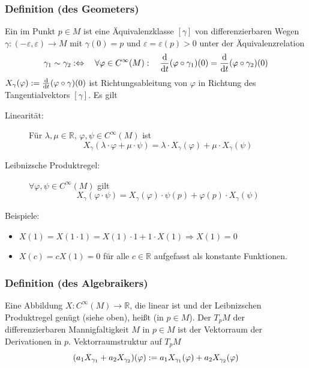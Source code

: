 \subsubsection[Definition: Tangentialraum (geometrisch)]{Definition (des Geometers)} %
\label{ssub:151}
Ein  im Punkt $p \in M$ ist eine Äquivalenzklasse $[\gamma]$ von differenzierbaren Wegen $\gamma : (-\varepsilon, \varepsilon) \to M$ mit 
$\gamma(0)=p$ und $\varepsilon = \varepsilon(p)>0$ unter der Äquivalenzrelation
\[
	\gamma_1 \sim \gamma_2 :\Leftrightarrow \quad \forall \varphi \in C^\infty(M) :\quad  \frac{\mathrm{d} }{\mathrm{d} t} ( \varphi \circ \gamma_1)(0) = \frac{\mathrm{d} }{\mathrm{d} t}  (\varphi \circ \gamma_2) (0)   
\]
$X_\gamma(\varphi) := \frac{\mathrm{d} }{\mathrm{d} t}  (\varphi \circ \gamma)(0)$ ist  Richtungsableitung von $\varphi$ in Richtung des Tangentialvektors $[\gamma]$. Es gilt
\begin{description}
	\item[Linearität:] Für $\lambda , \mu \in \mathds{R}$, $\varphi, \psi \in C^\infty(M) $ ist
	\[
		X_\gamma(\lambda  \cdot \varphi + \mu \cdot \psi) = \lambda \cdot X_\gamma(\varphi) + \mu \cdot X_\gamma(\psi)
	\] 
	\item[Leibnizsche Produktregel:] $\forall \varphi, \psi \in C^\infty(M) $ gilt
	\[
		X_\gamma(\varphi \cdot \psi) = X_\gamma(\varphi) \cdot \psi(p) + \varphi(p) \cdot X_\gamma(\psi)
	\]
\end{description}
Beispiele:
\begin{itemize}
	\item $X(1) = X(1 \cdot 1) = X(1) \cdot 1 + 1 \cdot X(1) \Rightarrow  X(1) =0$
	\item $X(c)= c X(1) = 0$ für alle $c \in \mathds{R}$ aufgefasst als konstante Funktionen.
\end{itemize}

\subsubsection[Definition: Tangentialraum (algebraisch)]{Definition (des Algebraikers)} %
\label{ssub:152}
Eine Abbildung $X : C^\infty (M) \to \mathds{R}$, die linear ist und der Leibnizschen Produktregel genügt (siehe oben), heißt  (in $p \in M$).
Der  $T_p M$ der differenzierbaren Mannigfaltigkeit $M$ in $p \in M$ ist der Vektorraum der Derivationen in $p$.
Vektorraumstruktur auf $T_p M$
\[
	\enbrace*{a_1 X_{\gamma_1} + a_2 X_{\gamma_2}}(\varphi) := a_1 X_{\gamma_1}(\varphi) + a_2 X_{\gamma_2}(\varphi) 
\]

